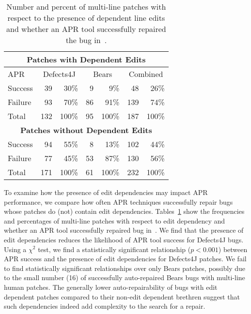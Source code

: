 \documentclass[sigconf, timestamp-false, anonymous=true]{acmart}
\begin{document}
\begin{table}
{\begin{center}
	\begin{tabular}{l | rr | rr | rr}
		\toprule
		\multicolumn{7}{c}{\textbf{Patches with Dependent Edits}} \\
		\midrule
		APR & \multicolumn{2}{c}{Defects4J} & \multicolumn{2}{c}{Bears} & \multicolumn{2}{c}{Combined} \\
		\midrule
		Success & 39 & 30\% & 9 & 9\% & 48 & 26\% \\
		Failure & 93 & 70\% & 86 & 91\% & 139 & 74\% \\
		\midrule
		Total & 132 & 100\% & 95 & 100\% & 187 & 100\% \\
		\midrule
		\multicolumn{7}{c}{\textbf{Patches without Dependent Edits}} \\
		\midrule
		Success & 94 & 55\% & 8 & 13\% & 102 & 44\% \\
		Failure & 77 & 45\% & 53 & 87\% & 130 & 56\% \\
		\midrule
		Total & 171 & 100\% & 61 & 100\% & 232 & 100\% \\
		\bottomrule
	\end{tabular}
 \end{center}
}
	\caption{Number and percent of multi-line patches with respect to the presence of 
	dependent line edits and whether an APR tool successfully 
	repaired the bug in~\cite{durieux-repair-them-all}.}
	\label{tab:dependency-repair-contingency-table}
\end{table}

To examine how the presence of edit dependencies may impact 
APR performance, we compare how often APR techniques 
successfully repair bugs whose patches do (not) contain edit dependencies.
Tables~\ref{tab:dependency-repair-contingency-table}
show the frequencies and percentages of multi-line patches with respect to edit dependency 
and whether an APR tool successfully repaired bug in~\cite{durieux-repair-them-all}.
We find that the presence of edit dependencies 
reduces the likelihood of APR tool success for Defects4J bugs.
Using a $\chi^2$ test, we find a statistically significant relationship ($p < 0.001$)
between APR success and the presence of edit dependencies for Defects4J patches. 
We fail to find statistically 
significant relationships over only Bears patches, possibly due to the small number (16) of 
successfully auto-repaired Bears bugs with multi-line human patches.
The generally lower auto-repairability of bugs with edit dependent patches compared 
to their non-edit dependent brethren suggest that such dependencies indeed 
add complexity to the search for a repair.
\end{document}
